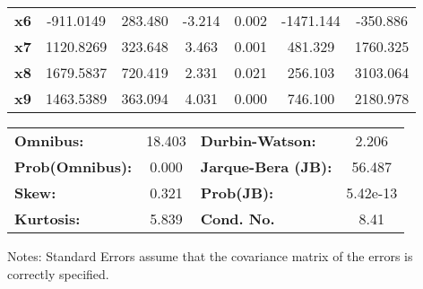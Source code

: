 \begin{center}
\begin{tabular}{lcccccc}
\textbf{x6}    &    -911.0149  &      283.480     &    -3.214  &         0.002        &    -1471.144    &     -350.886     \\
\textbf{x7}    &    1120.8269  &      323.648     &     3.463  &         0.001        &      481.329    &     1760.325     \\
\textbf{x8}    &    1679.5837  &      720.419     &     2.331  &         0.021        &      256.103    &     3103.064     \\
\textbf{x9}    &    1463.5389  &      363.094     &     4.031  &         0.000        &      746.100    &     2180.978     \\
\bottomrule
\end{tabular}
\begin{tabular}{lclc}
\textbf{Omnibus:}       & 18.403 & \textbf{  Durbin-Watson:     } &    2.206  \\
\textbf{Prob(Omnibus):} &  0.000 & \textbf{  Jarque-Bera (JB):  } &   56.487  \\
\textbf{Skew:}          &  0.321 & \textbf{  Prob(JB):          } & 5.42e-13  \\
\textbf{Kurtosis:}      &  5.839 & \textbf{  Cond. No.          } &     8.41  \\
\bottomrule
\end{tabular}
\end{center}

Notes: \newline
 [1] Standard Errors assume that the covariance matrix of the errors is correctly specified.